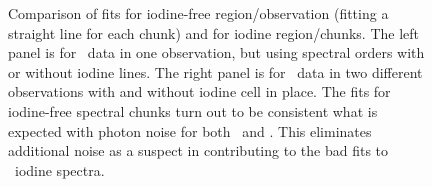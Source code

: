 \begin{figure}
\centering
{}
\caption{Comparison of fits for iodine-free region/observation
  (fitting a straight line for each chunk) and for iodine
  region/chunks. The left panel is for \het\ data in one observation,
  but using spectral orders with or without iodine lines. The right
  panel is for \keck\ data in two different observations with and
  without iodine cell in place. The fits for iodine-free spectral
  chunks turn out to be consistent what is expected with photon noise
  for both \het\ and \keck. This eliminates additional noise as a
  suspect in contributing to the bad fits to \het\ iodine spectra.
\label{het:fig:checksnr}}
\end{figure}



